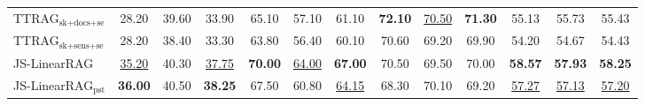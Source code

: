 \begin{table}[htbp]
{\begin{tabular}{@{}lcccccccccccc@{}}
    TTRAG$_{\text{sk+docs+se}}$
    & 28.20 & 39.60 & 33.90
    & 65.10 & 57.10 & 61.10
    & \textbf{72.10} & \underline{70.50} & \textbf{71.30}
    & 55.13 & 55.73 & 55.43 \\

    TTRAG$_{\text{sk+sens+se}}$
    & 28.20 & 38.40 & 33.30
    & 63.80 & 56.40 & 60.10
    & 70.60 & 69.20 & 69.90
    & 54.20 & 54.67 & 54.43 \\

    JS-LinearRAG
    & \underline{35.20} & 40.30 & \underline{37.75}
    & \textbf{70.00} & \underline{64.00} & \textbf{67.00}
    & 70.50 & 69.50 & 70.00
    & \textbf{58.57} & \textbf{57.93} & \textbf{58.25} \\

    JS-LinearRAG$_{\text{pst}}$
    & \textbf{36.00} & 40.50 & \textbf{38.25}
    & 67.50 & 60.80 & \underline{64.15}
    & 68.30 & 70.10 & 69.20
    & \underline{57.27} & \underline{57.13} & \underline{57.20} \\
    
    \bottomrule[1.5pt]
    \end{tabular}
  }
\end{table}


